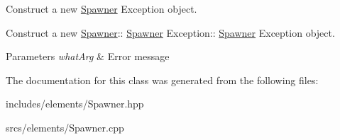 Construct a new \hyperlink{class_spawner}{Spawner} Exception object. 

Construct a new \hyperlink{class_spawner}{Spawner}\+:\+: \hyperlink{class_spawner}{Spawner} Exception\+:\+: \hyperlink{class_spawner}{Spawner} Exception object.


\begin{DoxyParams}{Parameters}
{\em what\+Arg} & Error message \\
\hline
\end{DoxyParams}


The documentation for this class was generated from the following files\+:\begin{DoxyCompactItemize}
\item 
includes/elements/Spawner.\+hpp\item 
srcs/elements/Spawner.\+cpp\end{DoxyCompactItemize}
